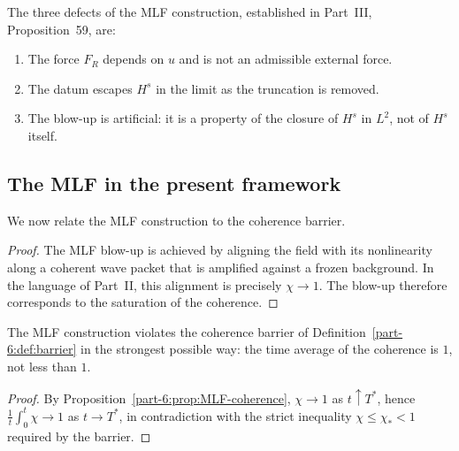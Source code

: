 The three defects of the MLF construction, established in Part~III, 
Proposition~59, are:
\begin{enumerate}[label=(\roman*),leftmargin=*]
\item The force $F_R$ depends on $u$ and is not an admissible 
      external force.
\item The datum escapes $H^s$ in the limit as the truncation is 
      removed.
\item The blow-up is artificial: it is a property of the closure of 
      $H^s$ in $L^2$, not of $H^s$ itself.
\end{enumerate}

\subsection{The MLF in the present framework}
\label{part-6:ssec:MLF-framework}

We now relate the MLF construction to the coherence barrier.


\begin{proof}
The MLF blow-up is achieved by aligning the field with its 
nonlinearity along a coherent wave packet that is amplified against 
a frozen background. In the language of Part~II, this alignment is 
precisely $\chi\to 1$. The blow-up therefore corresponds to the 
saturation of the coherence.
\end{proof}

\begin{corollary}\label{part-6:cor:MLF-violates}
The MLF construction violates the coherence barrier of 
Definition~\ref{part-6:def:barrier} in the strongest possible way: the 
time average of the coherence is $1$, not less than $1$.
\end{corollary}

\begin{proof}
By Proposition~\ref{part-6:prop:MLF-coherence}, $\chi\to 1$ as 
$t\uparrow T^\ast$, hence $\frac{1}{t}\int_0^t\chi\to 1$ as 
$t\to T^\ast$, in contradiction with the strict inequality 
$\chi\leq\chi_\ast<1$ required by the barrier.
\end{proof}


